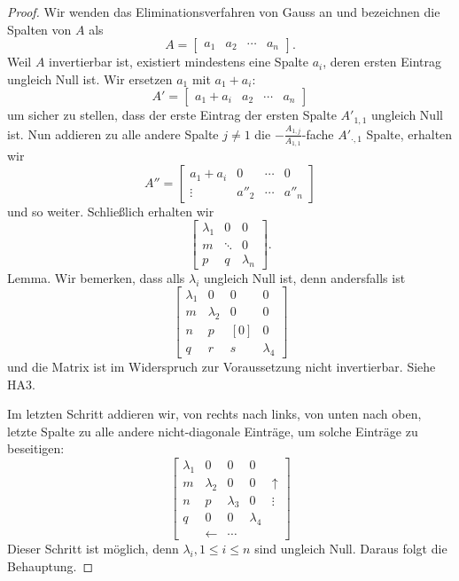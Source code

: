 \documentclass[fleqn,draft,a5paper,12pt]{article}
\theoremstyle{remark}
\begin{document}
\begin{proof}
  Wir wenden das Eliminationsverfahren von Gauss an und bezeichnen die
  Spalten von \(A\) als
  \[ A =
    \begin{bmatrix}
      a_{1} & a_{2} & \cdots & a_{n}
    \end{bmatrix}.
  \]
  Weil \(A\) invertierbar ist, existiert mindestens eine Spalte \(a_{i}\),
  deren ersten Eintrag ungleich Null ist.  Wir ersetzen \(a_{1}\) mit
  \(a_{1}+a_{i}\):
  \[ A' =
    \begin{bmatrix}
      a_{1}+a_{i} & a_{2} & \cdots & a_{n}
    \end{bmatrix}
  \]
  um sicher zu stellen, dass der erste Eintrag der ersten Spalte
  \(A'_{1,1}\) ungleich Null ist.  Nun addieren zu alle andere Spalte
  \(j \ne 1\) die \(-\frac{A_{1,j}}{A_{1,1}}\)-fache \(A'_{\cdot,1}\) Spalte,
  erhalten wir
  \[ A'' =
    \begin{bmatrix}
      a_{1} + a_{i} & 0 & \cdots & 0 \\
      \vdots & a''_{2} & \cdots & a''_{n}
    \end{bmatrix}
  \]
  und so weiter.  Schließlich erhalten wir
  \[
    \begin{bmatrix}
      \lambda_{1} & 0 & 0 \\
      m      &  \ddots & 0 \\
      p & q & \lambda_{n}
    \end{bmatrix}.   
  \]
  Lemma.  Wir bemerken, dass alls \(\lambda_{i}\) ungleich Null ist, denn andersfalls
  ist
  \[
    \begin{bmatrix}
      \lambda_{1} & 0 & 0 & 0 \\
      m & \lambda_{2} & 0 & 0 \\
      n & p & [0] & 0 \\
      q & r & s & \lambda_{4}
    \end{bmatrix}
  \]
  und die Matrix ist im Widerspruch zur Voraussetzung nicht
  invertierbar.  Siehe HA3.

  Im letzten Schritt addieren wir, von rechts nach links, von unten
  nach oben, letzte Spalte zu alle andere nicht-diagonale Einträge, um
  solche Einträge zu beseitigen:
  \[
    \begin{bmatrix}
      \lambda_{1} & 0 & 0 & 0  & \\
      m & \lambda_{2} & 0 & 0 & \uparrow \\
      n & p & \lambda_{3} & 0 & \vdots \\
      q & 0 & 0 & \lambda_{4} & \\
      & \leftarrow & \cdots  & & 
    \end{bmatrix}
  \]
  Dieser Schritt ist möglich, denn \(\lambda_{i}, 1 \le i \le n\) sind ungleich
  Null.  Daraus folgt die Behauptung.
\end{proof}
\end{document}

